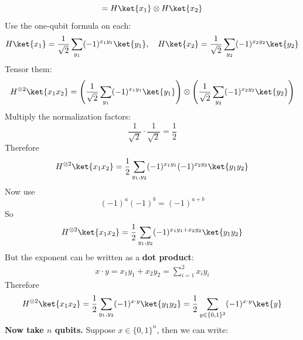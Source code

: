\begin{remarkbox}[: Explain $H\ket{x} = \frac{1}{\sqrt{2}} \sum_{y\in\{0,1\}} (-1)^{xy}\ket{y}$]
\begin{equation*}
        =
        H\ket{x_1}\otimes H\ket{x_2}
    \end{equation*}
    Use the one-qubit formula on each:
    \begin{equation*}
        H\ket{x_1}
        =
        \frac{1}{\sqrt{2}}
        \sum_{y_1}
        (-1)^{x_1y_1}\ket{y_1}, \quad
        H\ket{x_2}
        =
        \frac{1}{\sqrt{2}}
        \sum_{y_2}
        (-1)^{x_2y_2}\ket{y_2}
    \end{equation*}
    Tensor them:
    \begin{equation*}
        H^{\otimes2}\ket{x_1x_2}
        =
        \left(
            \frac{1}{\sqrt{2}}
            \sum_{y_1}
            (-1)^{x_1y_1}\ket{y_1}
        \right)
        \otimes
        \left(
            \frac{1}{\sqrt{2}}
            \sum_{y_2}
            (-1)^{x_2y_2}\ket{y_2}
        \right)
    \end{equation*}
    Multiply the normalization factors:
    \begin{equation*}
        \frac{1}{\sqrt{2}} \cdot \frac{1}{\sqrt{2}}
        =
        \frac{1}{2}
    \end{equation*}
    Therefore
    \begin{equation*}
        H^{\otimes2}\ket{x_1x_2}
        =
        \frac{1}{2}
        \sum_{y_1,y_2}
        (-1)^{x_1y_1}
        (-1)^{x_2y_2}
        \ket{y_1y_2}
    \end{equation*}
    Now use
    \begin{equation*}
        (-1)^a(-1)^b=(-1)^{a+b}
    \end{equation*}
    So
    \begin{equation*}
        H^{\otimes2}\ket{x_1x_2}
        =
        \frac{1}{2}
        \sum_{y_1,y_2}
        (-1)^{x_1y_1+x_2y_2}
        \ket{y_1y_2}
    \end{equation*}
    But the exponent can be written as a \textbf{dot product}:
    \begin{align*}
        x \cdot y =
        x_1y_1+x_2y_2 =
        \sum_{i=1}^{2} x_i y_i
    \end{align*}
    Therefore
    \begin{equation*}
        H^{\otimes2}\ket{x_1x_2}
        =
        \frac{1}{2}
        \sum_{y_1,y_2}
        (-1)^{x \cdot y}
        \ket{y_1y_2}
        =
        \frac{1}{2}
        \sum_{y \in \{0,1\}^2}
        (-1)^{x \cdot y}
        \ket{y}
    \end{equation*}
    \textcolor{Green3}{ \textbf{Now take $n$ qubits.}} Suppose $x \in \{0,1\}^n$, then we can write:

\end{remarkbox}
